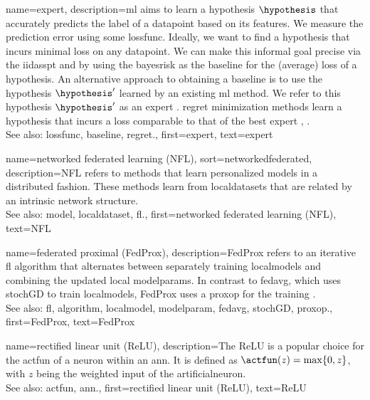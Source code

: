 {name={expert},
	description={\gls{ml} aims to learn a \gls{hypothesis} $\hypothesis$ that accurately predicts the \gls{label} 
		of a \gls{datapoint} based on its \glspl{feature}. We measure the \gls{prediction} error using 
		some \gls{lossfunc}. Ideally, we want to find a \gls{hypothesis} that incurs minimal \gls{loss} 
		on any \gls{datapoint}. We can make this informal goal precise via the \gls{iidasspt} 
		and by using the \gls{bayesrisk} as the \gls{baseline} for the (average) \gls{loss} of a \gls{hypothesis}. 
		An alternative approach to obtaining a \gls{baseline} is to use the \gls{hypothesis} $\hypothesis'$ learned 
		by an existing \gls{ml} method. We refer to this \gls{hypothesis} $\hypothesis'$ as an expert \cite{PredictionLearningGames}. 
		\Gls{regret} minimization methods learn a \gls{hypothesis}
		that incurs a \gls{loss} comparable to that of the best expert \cite{PredictionLearningGames}, \cite{HazanOCO}.
					\\ 
		See also: \gls{lossfunc}, \gls{baseline}, \gls{regret}.},
	first={expert},
	text={expert} 
}

{name={networked federated learning (NFL)},
sort={networkedfederated},
	description={NFL refers 
		to methods that learn personalized \glspl{model} in a distributed fashion. These methods learn from \glspl{localdataset} 
		that are related by an intrinsic network structure.
					\\ 
		See also: \gls{model}, \gls{localdataset}, \gls{fl}.},
	first={networked federated learning (NFL)},
	text={NFL} 
}

{name={federated proximal (FedProx)},
	description={FedProx refers to an 
		iterative \gls{fl} \gls{algorithm} that alternates between separately 
		\gls{training} \glspl{localmodel} and combining the updated 
		local \glspl{modelparam}. In contrast to \gls{fedavg}, which uses 
		\gls{stochGD} to train \glspl{localmodel}, FedProx uses a \gls{proxop} 
		for the \gls{training} \cite{FedProx2020}.
					\\ 
		See also: \gls{fl}, \gls{algorithm}, \gls{localmodel}, \gls{modelparam}, \gls{fedavg}, \gls{stochGD}, \gls{proxop}.}, 
	first={FedProx}, 
	text={FedProx} 
}

{name={rectified linear unit (ReLU)},
	description={The ReLU is 
		a popular choice for the \gls{actfun} of a \gls{neuron} within an \gls{ann}. It is defined 
		as $\actfun(z) = \max\{0,z\}$, with $z$ being the weighted input of the \gls{artificialneuron}.
					\\ 
		See also: \gls{actfun}, \gls{ann}.}, 
	first={rectified linear unit (ReLU)}, 
	text={ReLU} 
}

